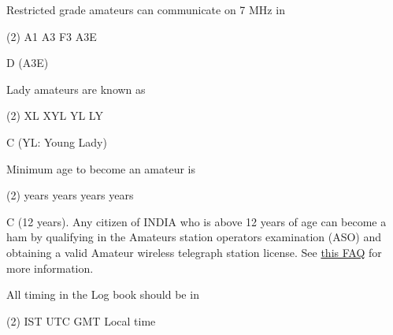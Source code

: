 \documentclass[a4paper]{article}
\begin{document}
\vspace{5mm}



\begin{question}Restricted grade amateurs can communicate on 7 MHz in
	\begin{tasks}(2)
		\task A1
		\task A3
		\task F3
		\task A3E
	\end{tasks}
\end{question}

\begin{solution}
	D (A3E)
\end{solution}

\vspace{5mm}



\begin{question}Lady amateurs are known as
	\begin{tasks}(2)
		\task XL
		\task XYL
		\task YL
		\task LY
	\end{tasks}
\end{question}

\begin{solution}
	C (YL: Young Lady)
\end{solution}

\vspace{5mm}



\begin{question}Minimum age to become an amateur is
	\begin{tasks}(2)
		 years
		 years
		 years
		 years
	\end{tasks}
\end{question}

\begin{solution}
	C (12 years). Any citizen of INDIA who is above 12 years of age can become a ham by qualifying in the Amateurs station operators\apostrophe{} examination (ASO) and obtaining a valid Amateur wireless telegraph station license. See \href{http://arsi.info/faq/}{this FAQ} for more information.
\end{solution}

\vspace{5mm}



\begin{question}All timing in the Log book should be in
	\begin{tasks}(2)
		\task IST
		\task UTC
		\task GMT
		\task Local time
	\end{tasks}
\end{question}
\end{document}
